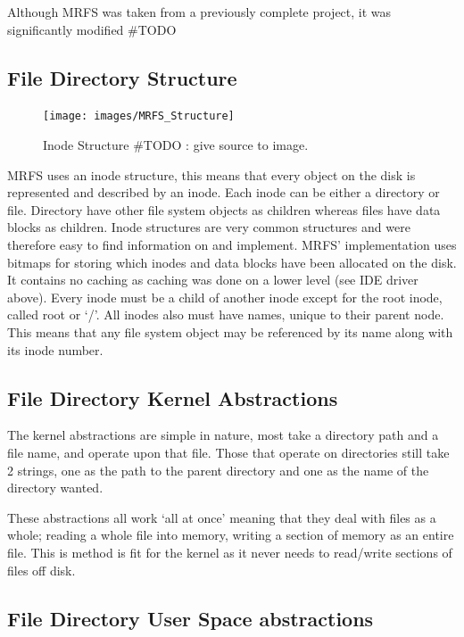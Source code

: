 \documentclass[a4paper]{report}
\begin{document}
Although MRFS was taken from a previously complete project, it was significantly modified #TODO

\subsection{File Directory Structure}

\begin{figure}[ht]
\centering
\texttt{[image: images/MRFS\_Structure]}
\caption{Inode Structure #TODO : give source to image.}
\label{fig:WinTitleBarScreen}
\end{figure}


MRFS uses an inode structure, this means that every object on the disk is represented and described by an inode. Each inode can be either a directory or file. Directory have other file system objects as children whereas files have data blocks as children. Inode structures are very common structures and were therefore easy to find information on and implement. MRFS' implementation uses bitmaps for storing which inodes and data blocks have been allocated on the disk. It contains no caching as caching was done on a lower level (see IDE driver above). Every inode must be a child of another inode except for the root inode, called root or `/'. All inodes also must have names, unique to their parent node. This means that any file system object may be referenced by its name along with its inode number.

\subsection{File Directory Kernel Abstractions}

The kernel abstractions are simple in nature, most take a directory path and a file name, and operate upon that file. Those that operate on directories still take 2 strings, one as the path to the parent directory and one as the name of the directory wanted.

These abstractions all work `all at once' meaning that they deal with files as a whole; reading a whole file into memory, writing a section of memory as an entire file. This is method is fit for the kernel as it never needs to read/write sections of files off disk.

\subsection{File Directory User Space abstractions}
\end{document}
